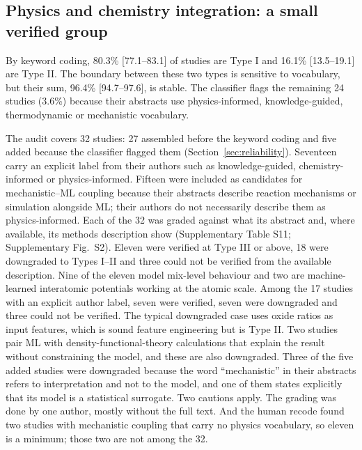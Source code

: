 \documentclass[pdflatex,sn-basic]{sn-jnl}
\begin{document}
\subsection{Physics and chemistry integration: a small verified group}\label{sec:physics}

By keyword coding, 80.3\% [77.1--83.1] of studies are Type I and 16.1\% [13.5--19.1] are Type II. The boundary between these two types is sensitive to vocabulary, but their sum, 96.4\% [94.7--97.6], is stable. The classifier flags the remaining 24 studies (3.6\%) because their abstracts use physics-informed, knowledge-guided, thermodynamic or mechanistic vocabulary.

The audit covers 32 studies: 27 assembled before the keyword coding and five added because the classifier flagged them (Section~\ref{sec:reliability}). Seventeen carry an explicit label from their authors such as knowledge-guided, chemistry-informed or physics-informed. Fifteen were included as candidates for mechanistic--ML coupling because their abstracts describe reaction mechanisms or simulation alongside ML; their authors do not necessarily describe them as physics-informed. Each of the 32 was graded against what its abstract and, where available, its methods description show (Supplementary Table S11; Supplementary Fig.~S2). Eleven were verified at Type III or above, 18 were downgraded to Types I--II and three could not be verified from the available description. Nine of the eleven model mix-level behaviour and two are machine-learned interatomic potentials working at the atomic scale. Among the 17 studies with an explicit author label, seven were verified, seven were downgraded and three could not be verified. The typical downgraded case uses oxide ratios as input features, which is sound feature engineering but is Type II. Two studies pair ML with density-functional-theory calculations that explain the result without constraining the model, and these are also downgraded. Three of the five added studies were downgraded because the word ``mechanistic'' in their abstracts refers to interpretation and not to the model, and one of them states explicitly that its model is a statistical surrogate. Two cautions apply. The grading was done by one author, mostly without the full text. And the human recode found two studies with mechanistic coupling that carry no physics vocabulary, so eleven is a minimum; those two are not among the 32.
\end{document}
